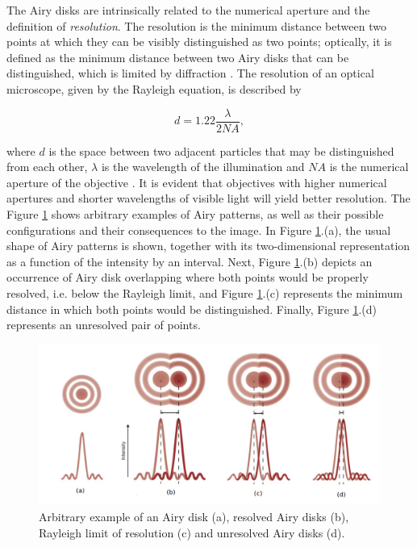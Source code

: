 The Airy disks are intrinsically related to the numerical aperture and the definition of \emph{resolution}. The resolution is the minimum distance between two points at which they can be visibly distinguished as two points; optically, it is defined as the minimum distance between two Airy disks that can be distinguished, which is limited by diffraction \cite{leng2009materials}. The resolution of an optical microscope, given by the Rayleigh equation, is described by

\begin{equation}
\label{eqn:resolution}
d = 1.22 \frac{\lambda}{2 NA},
\end{equation}

\noindent where $d$ is the space between two adjacent particles that may be distinguished from each other, $\lambda$ is the wavelength of the illumination and $NA$ is the numerical aperture of the objective \cite{davidson2002optical}. It is evident that objectives with higher numerical apertures and shorter wavelengths of visible light will yield better resolution. The Figure \ref{fig:airy_disks} shows arbitrary examples of Airy patterns, as well as their possible configurations and their consequences to the image. In Figure \ref{fig:airy_disks}.(a), the usual shape of Airy patterns is shown, together with its two-dimensional representation as a function of the intensity by an interval. Next, Figure \ref{fig:airy_disks}.(b) depicts an occurrence of Airy disk overlapping where both points would be properly resolved, i.e. below the Rayleigh limit, and Figure \ref{fig:airy_disks}.(c) represents the minimum distance in which both points would be distinguished. Finally, Figure \ref{fig:airy_disks}.(d) represents an unresolved pair of points.

\begin{figure}[htb]
	\centering
	\caption{\label{fig:airy_disks} Arbitrary example of an Airy disk (a), resolved Airy disks (b), Rayleigh limit of resolution (c) and unresolved Airy disks (d).} 
	\begin{center}
	    \includegraphics[scale=0.4]{images/airy_disks.png}
	\end{center}
	\centering
\end{figure}

